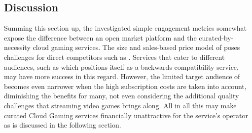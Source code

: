 \subsection{Discussion}

Summing this section up, the investigated simple engagement metrics somewhat expose the difference between an open market platform and the curated-by-necessity cloud gaming services. The size and sales-based price model of \steam poses challenges for direct competitors such as \gfnow. Services that cater to different audiences, such as \psnow which positions itself as a backwards compatibility service, may have more success in this regard. However, the limited target audience of \psnow becomes even narrower when the high subscription costs are taken into account, diminishing the benefits for many, not even considering the additional quality challenges that streaming video games brings along. All in all this may make curated Cloud Gaming services financially unattractive for the service's operator as is discussed in the following section.














